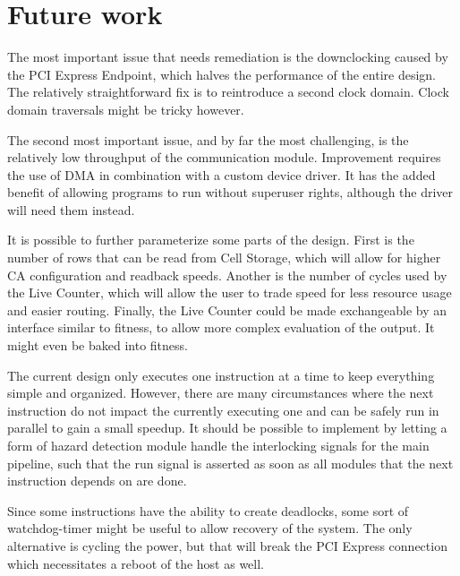 

\section{Future work}

The most important issue that needs remediation is the downclocking caused by the PCI Express Endpoint, which halves the performance of the entire design.
The relatively straightforward fix is to reintroduce a second clock domain.
Clock domain traversals might be tricky however.

The second most important issue, and by far the most challenging, is the relatively low throughput of the communication module.
Improvement requires the use of DMA in combination with a custom device driver.
It has the added benefit of allowing programs to run without superuser rights, although the driver will need them instead.

It is possible to further parameterize some parts of the design.
First is the number of rows that can be read from Cell Storage, which will allow for higher CA configuration and readback speeds.
Another is the number of cycles used by the Live Counter, which will allow the user to trade speed for less resource usage and easier routing.
Finally, the Live Counter could be made exchangeable by an interface similar to fitness, to allow more complex evaluation of the output.
It might even be baked into fitness.

The current design only executes one instruction at a time to keep everything simple and organized.
However, there are many circumstances where the next instruction do not impact the currently executing one and can be safely run in parallel to gain a small speedup.
It should be possible to implement by letting a form of hazard detection module handle the interlocking signals for the main pipeline, such that the run signal is asserted as soon as all modules that the next instruction depends on are done.

Since some instructions have the ability to create deadlocks, some sort of watchdog-timer might be useful to allow recovery of the system.
The only alternative is cycling the power, but that will break the PCI Express connection which necessitates a reboot of the host as well.


